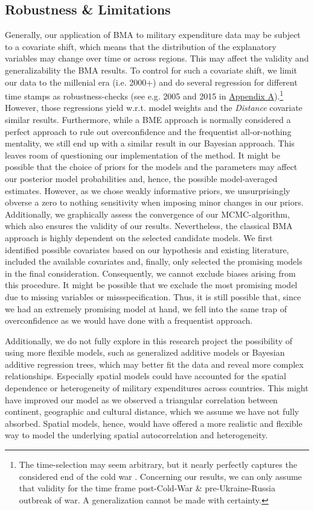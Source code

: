 \documentclass[12pt,a4paper]{article}
\begin{document}
\subsection{Robustness \& Limitations}
Generally, our application of BMA to military expenditure data may be subject to a covariate shift, which means that the distribution of the explanatory variables may change over time or across regions. This may affect the validity and generalizability the BMA results. To control for such a covariate shift, we limit our data to the millenial era (i.e. 2000+) and do several regression for different time stamps as robustness-checks (see e.g. 2005 and 2015 in \hyperref[Appendix Tables]{\color{blue}Appendix A}).\footnote{The time-selection may seem arbitrary, but it nearly perfectly captures the considered end of the cold war \citep{gray2005}. Concerning our results, we can only assume that validity for the time frame post-Cold-War \& pre-Ukraine-Russia outbreak of war. A generalization cannot be made with certainty.} However, those regressions yield w.r.t. model weights and the \textit{Distance} covariate similar results. 
\clearpage
Furthermore, while a BME approach is normally considered a perfect approach to rule out overconfidence and the frequentist all-or-nothing mentality, we still end up with a similar result in our Bayesian approach. This leaves room of questioning our implementation of the method. It might be possible that the choice of priors for the models and the parameters may affect our posterior model probabilities and, hence, the possible model-averaged estimates. However, as we chose weakly informative priors, we unsurprisingly obverse a zero to nothing sensitivity when imposing minor changes in our priors. Additionally, we graphically assess the convergence of our MCMC-algorithm, which also ensures the validity of our results. Nevertheless, the classical BMA approach is highly dependent on the selected candidate models. We first identified possible covariates based on our hypothesis and existing literature, included the available covariates and, finally, only selected the promising models in the final consideration. Consequently, we cannot exclude biases arising from this procedure. It might be possible that we exclude the most promising model due to missing variables or missspecification. Thus, it is still possible that, since we had an extremely promising model at hand, we fell into the same trap of overconfidence as we would have done with a frequentist approach.

Additionally, we do not fully explore in this research project the possibility of using more flexible models, such as generalized additive models or Bayesian additive regression trees, which may better fit the data and reveal more complex relationships. Especially spatial models could have accounted for the spatial dependence or heterogeneity of military expenditures across countries. This might have improved our model as we observed a triangular correlation between continent, geographic and cultural distance, which we assume we have not fully absorbed. Spatial models, hence, would have offered a more realistic and flexible way to model the underlying spatial autocorrelation and heterogeneity.
\end{document}
